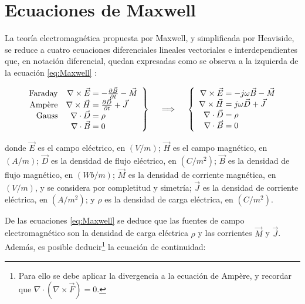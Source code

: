 \section{Ecuaciones de Maxwell}
\label{subsec_ecuaciones_maxwell}
La teoría electromagnética propuesta por Maxwell, y simplificada por Heaviside, se reduce a cuatro ecuaciones diferenciales lineales vectoriales e interdependientes que, en notación diferencial, quedan expresadas como se observa a la izquierda de la ecuación \ref{eq:Maxwell} \cite{Pozar:MwEngineering}:

\begin{align}
\label{eq:Maxwell}
\left.\begin{array}{rr@{\mskip\thickmuskip}l}
\text{Faraday} &\nabla \times \vec{E} & = -\frac{\partial \vec{B}}{\partial t} - \vec{M}\\
\text{Ampère} &\nabla \times \vec{H} & = \frac{\partial \vec{D}}{\partial t} + \vec{J} \\
\text{Gauss} &\nabla \cdot \vec{D} & = \rho \\
& \nabla \cdot \vec{B} & = 0
\end{array} \right\}
\quad \implies \quad
\left\{\begin{array}{r@{\mskip\thickmuskip}l}
\nabla \times \vec{E} & = -j \omega \vec{B} - \vec{M} \\
\nabla \times \vec{H} & = j \omega \vec{D} + \vec{J} \\
\nabla \cdot \vec{D} & = \rho\\
\nabla \cdot \vec{B} & = 0
\end{array}\right.
\end{align}

donde $\vec{E}$ es el campo eléctrico, en $(V/m)$; $\vec{H}$ es el campo magnético, en $(A/m)$; $\vec{D}$ es la densidad de flujo eléctrico, en $(C/m^2)$; $\vec{B}$ es la densidad de flujo magnético, en $(Wb/m)$; $\vec{M}$ es la densidad de corriente magnética, en $(V/m)$, y se considera por completitud y simetría; $\vec{J}$ es la densidad de corriente eléctrica, en $(A/m^2)$; y $\rho$ es la densidad de carga eléctrica, en $(C/m^2)$.

De las ecuaciones \ref{eq:Maxwell} se deduce que las fuentes de campo electromagnético son la densidad de carga eléctrica $\rho$ y las corrientes $\vec{M}$ y $\vec{J}$. Además, es posible deducir\footnote{Para ello se debe aplicar la divergencia a la ecuación de Ampère, y recordar que $\nabla \cdot (\nabla \times \vec{F}) = 0$.} la ecuación de continuidad:

